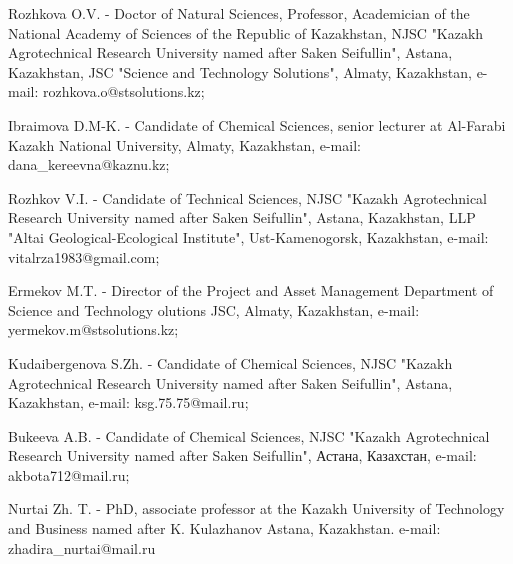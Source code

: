 \begin{noparindent}
Rozhkova O.V. - Doctor of Natural Sciences, Professor, Academician of
the National Academy of Sciences of the Republic of Kazakhstan, NJSC
"Kazakh Agrotechnical Research University named after Saken Seifullin",
Astana, Kazakhstan, JSC "Science and Technology Solutions", Almaty,
Kazakhstan, e-mail: rozhkova.o@stsolutions.kz;

Ibraimova D.M-K. - Candidate of Chemical Sciences, senior lecturer at
Al-Farabi Kazakh National University, Almaty, Kazakhstan, e-mail:
dana\_kereevna@kaznu.kz;

Rozhkov V.I. - Candidate of Technical Sciences, NJSC "Kazakh
Agrotechnical Research University named after Saken Seifullin", Astana,
Kazakhstan, LLP "Altai Geological-Ecological Institute",
Ust-Kamenogorsk, Kazakhstan, e-mail: vitalrza1983@gmail.com;

Ermekov M.T. - Director of the Project and Asset Management Department
of Science and Technology olutions JSC, Almaty, Kazakhstan, e-mail:
yermekov.m@stsolutions.kz;

Kudaibergenova S.Zh. - Candidate of Chemical Sciences, NJSC "Kazakh
Agrotechnical Research University named after Saken Seifullin", Astana,
Kazakhstan, e-mail: ksg.75.75@mail.ru;

Bukeeva A.B. - Candidate of Chemical Sciences, NJSC "Kazakh
Agrotechnical Research University named after Saken Seifullin", Астана,
Казахстан, e-mail: akbota712@mail.ru;

Nurtai Zh. T. - PhD, associate professor at the Kazakh University of
Technology and Business named after K. Kulazhanov Astana, Kazakhstan.
e-mail: zhadira\_nurtai@mail.ru
\end{noparindent}

